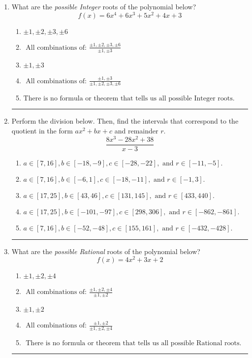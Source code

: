\documentclass[14pt]{extbook}
\newcommand{\litem}[1]{\item#1\hspace*{-1cm}\rule{\textwidth}{0.4pt}}
\begin{document}
\begin{enumerate}
\litem{
What are the \textit{possible Integer} roots of the polynomial below?\[ f(x) = 6x^{4} +6 x^{3} +5 x^{2} +4 x + 3 \]\begin{enumerate}[label=\Alph*.]
\item \( \pm 1,\pm 2,\pm 3,\pm 6 \)
\item \( \text{ All combinations of: }\frac{\pm 1,\pm 2,\pm 3,\pm 6}{\pm 1,\pm 3} \)
\item \( \pm 1,\pm 3 \)
\item \( \text{ All combinations of: }\frac{\pm 1,\pm 3}{\pm 1,\pm 2,\pm 3,\pm 6} \)
\item \( \text{There is no formula or theorem that tells us all possible Integer roots.} \)

\end{enumerate} }
\litem{
Perform the division below. Then, find the intervals that correspond to the quotient in the form $ax^2+bx+c$ and remainder $r$.\[ \frac{8x^{3} -28 x^{2} + 38}{x -3} \]\begin{enumerate}[label=\Alph*.]
\item \( a \in [7, 16], b \in [-18, -9], c \in [-28, -22], \text{ and } r \in [-11, -5]. \)
\item \( a \in [7, 16], b \in [-6, 1], c \in [-18, -11], \text{ and } r \in [-1, 3]. \)
\item \( a \in [17, 25], b \in [43, 46], c \in [131, 145], \text{ and } r \in [433, 440]. \)
\item \( a \in [17, 25], b \in [-101, -97], c \in [298, 306], \text{ and } r \in [-862, -861]. \)
\item \( a \in [7, 16], b \in [-52, -48], c \in [155, 161], \text{ and } r \in [-432, -428]. \)

\end{enumerate} }
\litem{
What are the \textit{possible Rational} roots of the polynomial below?\[ f(x) = 4x^{2} +3 x + 2 \]\begin{enumerate}[label=\Alph*.]
\item \( \pm 1,\pm 2,\pm 4 \)
\item \( \text{ All combinations of: }\frac{\pm 1,\pm 2,\pm 4}{\pm 1,\pm 2} \)
\item \( \pm 1,\pm 2 \)
\item \( \text{ All combinations of: }\frac{\pm 1,\pm 2}{\pm 1,\pm 2,\pm 4} \)
\item \( \text{ There is no formula or theorem that tells us all possible Rational roots.} \)


\end{enumerate}}
\end{enumerate}
\end{document}
